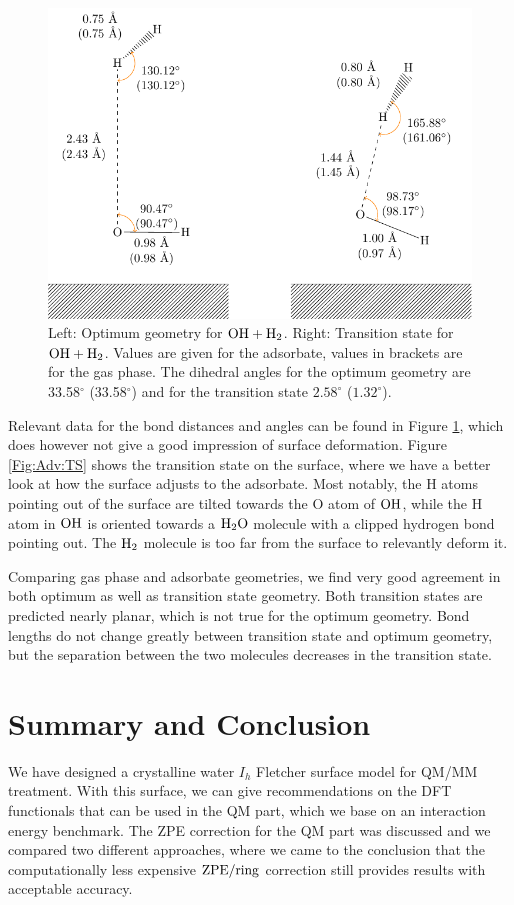 \documentclass[8.5pt,twoside,twocolumn]{article}
\newcommand\zpe{\enmat{\te{ZPE}}}
\newcommand\zpering{\enmat{\zpe/\te{ring}}}
\theoremstyle{standard}
\begin{document}
\begin{figure}[t!]
\includegraphics[width=.49\textwidth]{TikzPics/TikzCreation/HO.H2/HOH2.pdf}
\caption{Left: Optimum geometry for $\mbox{\ensuremath{\text O \text H+\text H_2}}$. Right: Transition state for $\mbox{\ensuremath{\text O \text H+\text H_2}}$.
Values are given for the adsorbate, values in brackets are for the gas phase. The
dihedral angles for the optimum geometry are 33.58$^{\circ}$ (33.58$^{\circ}$)
and for the transition state $2.58^{\circ}$ ($1.32^{\circ}$).}

\label{Fig:Adv:TSLengths}
\end{figure}


Relevant data for the bond distances and angles can be found in Figure
\ref{Fig:Adv:TSLengths}, which does however not give a good impression of
surface deformation. Figure \ref{Fig:Adv:TS} shows the transition state
on the surface, where we have a better look at how the surface adjusts to
the adsorbate. Most notably, the H atoms pointing out of the surface are
tilted towards the O atom of $\text O \text H$, while the H atom in $\text O \text H$ is oriented
towards a $\text H _2 \text O$ molecule with a clipped hydrogen bond pointing out. The
$\text H_2$ molecule is too far from the surface to relevantly deform it.

Comparing gas phase and adsorbate geometries, we find very good agreement in
both optimum as well as transition state geometry. Both transition states are
predicted nearly planar, which is not true for the optimum geometry. Bond
lengths do not change greatly between transition state and optimum geometry,
but the separation between the two molecules decreases in the transition state.



\section{Summary and Conclusion}
\label{Sec:Con}
We have designed a crystalline water $I_h$ Fletcher surface model for QM/MM
treatment. With this surface, we can give recommendations on the DFT functionals
that can be used in the QM part, which we base on an interaction energy
benchmark. The ZPE correction for the QM part was discussed and we compared
two different approaches, where we came to the conclusion that the
computationally less expensive $\zpering$ correction still provides results with
acceptable accuracy.
\end{document}
